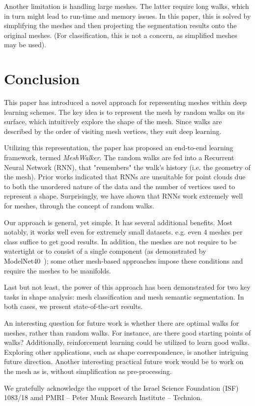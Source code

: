\documentclass[acmtog]{acmart}
\begin{document}
Another limitation is handling large meshes.
The latter require long walks, which in turn might lead to run-time and memory issues.
In this paper, this is solved by simplifying the meshes and then projecting the segmentation results onto the original meshes.
(For classification, this is not a concern, as simplified meshes may be used).


\section{Conclusion}
\label{sec:conclusion}
This paper has introduced a novel approach for representing meshes within deep learning schemes. 
The key idea is to represent the mesh by random walks on its surface, which intuitively explore the shape of the mesh.
Since walks are described by the order of visiting mesh vertices, they suit deep learning.

Utilizing this representation, the paper has proposed an end-to-end learning framework, termed {\em MeshWalker}.
The random walks are fed into a Recurrent Neural Network (RNN), that "remembers" the walk’s history (i.e. the geometry of the mesh).
Prior works indicated that RNNs are unsuitable for point clouds due to both the unordered nature of the data and the number of vertices used to represent a shape. Surprisingly, we have shown that RNNs work extremely well for meshes, through the concept of random walks. 

Our approach is general, yet simple.
It has several additional benefits.
Most notably, it works well even for extremely small datasets. e.g.  even $4$ meshes per class suffice  to get good results. 
In addition, the meshes are not require to be watertight or to consist of a single component (as demonstrated by ModelNet40~\cite{wu20153d}); some other mesh-based approaches impose these conditions and require the meshes to be manifolds.

Last but not least, the power of this approach has been demonstrated for two key tasks in shape analysis: mesh classification and mesh semantic segmentation. 
In both cases, we present  state-of-the-art  results.

An interesting question for future work is whether there are optimal walks for meshes, rather than random walks.
For instance, are there good starting points of walks?
Additionally, reinforcement learning could be utilized to learn good walks.
Exploring other applications, such as shape correspondence,
is another intriguing future direction.
Another interesting practical future work would be to work on the mesh as is, without simplification as pre-processing.

\begin{acks}
  We gratefully acknowledge the support of the Israel Science Foundation (ISF) 1083/18 amd PMRI -- Peter Munk Research Institute -- Technion.
\end{acks}





 
\end{document}
